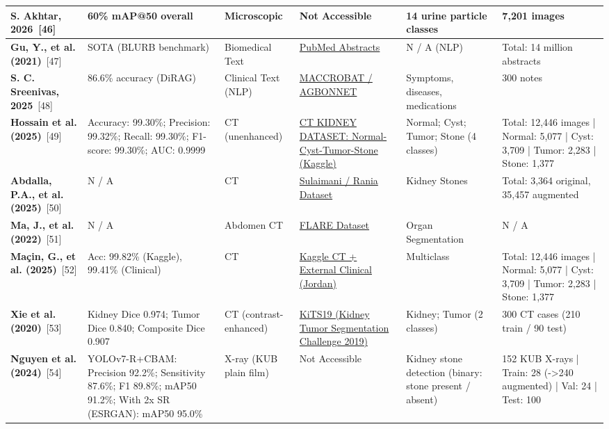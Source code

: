 \documentclass{article}
\begin{document}
\begin{longtable}{|L{2.8cm}|L{2.5cm}|L{1.5cm}|L{3.5cm}|L{3.5cm}|L{4.5cm}|}
\hline
\textbf{S. Akhtar, 2026}~[46] & 60\% mAP@50 overall & Microscopic & Not Accessible & 14 urine particle classes & 7,201 images \\
\hline
\textbf{Gu, Y., et al. (2021)}~[47] & SOTA (BLURB benchmark) & Biomedical Text & \href{https://huggingface.co/datasets/ncbi/pubmed}{PubMed Abstracts} & N / A (NLP) & Total: 14 million abstracts \\
\hline
\textbf{S. C. Sreenivas, 2025}~[48] & 86.6\% accuracy (DiRAG) & Clinical Text (NLP) & \href{https://doi.org/10.6084/m9.figshare.9764942.v2}{MACCROBAT / AGBONNET} & Symptoms, diseases, medications & 300 notes \\
\hline
\textbf{Hossain et al. (2025)}~[49] & Accuracy: 99.30\%; Precision: 99.32\%; Recall: 99.30\%; F1-score: 99.30\%; AUC: 0.9999 & CT (unenhanced) & \href{https://www.kaggle.com/datasets/nazmul0087/ct-kidney-dataset-normal-cyst-tumor-and-stone}{CT KIDNEY DATASET: Normal-Cyst-Tumor-Stone (Kaggle)} & Normal; Cyst; Tumor; Stone (4 classes) & Total: 12,446 images | Normal: 5,077 | Cyst: 3,709 | Tumor: 2,283 | Stone: 1,377 \\
\hline
\textbf{Abdalla, P.A., et al. (2025)}~[50] & N / A & CT & \href{https://www.kaggle.com/datasets/orvile/axial-ct-imaging-dataset-kidney-stone-detection}{Sulaimani / Rania Dataset} & Kidney Stones & Total: 3,364 original, 35,457 augmented \\
\hline
\textbf{Ma, J., et al. (2022)}~[51] & N / A & Abdomen CT & \href{https://flare.grand-challenge.org/Data/}{FLARE Dataset} & Organ Segmentation & N / A \\
\hline
\textbf{Maçin, G., et al. (2025)}~[52] & Acc: 99.82\% (Kaggle), 99.41\% (Clinical) & CT & \href{https://www.kaggle.com/datasets/nazmul0087/ct-kidney-dataset-normal-cyst-tumor-and-stone}{Kaggle CT + External Clinical (Jordan)} & Multiclass & Total: 12,446 images | Normal: 5,077 | Cyst: 3,709 | Tumor: 2,283 | Stone: 1,377 \\
\hline
\textbf{Xie et al. (2020)}~[53] & Kidney Dice 0.974; Tumor Dice 0.840; Composite Dice 0.907 & CT (contrast-enhanced) & \href{https://github.com/neheller/kits19/tree/master/data}{KiTS19 (Kidney Tumor Segmentation Challenge 2019)} & Kidney; Tumor (2 classes) & 300 CT cases (210 train / 90 test) \\
\hline
\textbf{Nguyen et al. (2024)}~[54] & YOLOv7-R+CBAM: Precision 92.2\%; Sensitivity 87.6\%; F1 89.8\%; mAP50 91.2\%; With 2x SR (ESRGAN): mAP50 95.0\% & X-ray (KUB plain film) & Not Accessible & Kidney stone detection (binary: stone present / absent) & 152 KUB X-rays | Train: 28 (->240 augmented) | Val: 24 | Test: 100 \\

\end{longtable}
\end{document}
